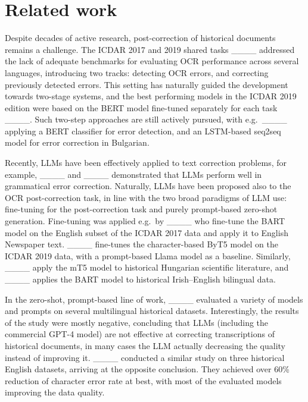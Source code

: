 \section{Related work}
Despite decades of active research, post-correction of historical documents remains a challenge. The ICDAR 2017 and 2019 shared tasks ____ addressed the lack of adequate benchmarks for evaluating OCR performance across several languages, introducing two tracks: detecting OCR errors, and correcting previously detected errors. This setting has naturally guided the development towards two-stage systems, and the best performing models in the ICDAR 2019 edition were based on the BERT model fine-tuned separately for each task ____. Such two-step approaches are still actively pursued, with e.g.\ ____ applying a BERT classifier for error detection, and an LSTM-based seq2seq model for error correction in Bulgarian.





Recently, LLMs have been effectively applied to text correction problems, for example, ____ and ____ demonstrated that LLMs perform well in grammatical error correction. Naturally, LLMs have been proposed also to the OCR post-correction task, in line with the two broad paradigms of LLM use: fine-tuning for the post-correction task and purely prompt-based zero-shot generation. Fine-tuning was applied e.g.\ by ____ who fine-tune the BART model on the English subset of the ICDAR 2017 data and apply it to English Newspaper text. ____ fine-tunes the character-based ByT5 model on the ICDAR 2019 data, with a prompt-based Llama model as a baseline. Similarly, ____ apply the mT5 model to historical Hungarian scientific literature, and ____ applies the BART model to historical Irish--English bilingual data. 


In the zero-shot, prompt-based line of work, ____ evaluated a variety of models and prompts on several multilingual historical datasets. Interestingly, the results of the study were mostly negative, concluding that LLMs (including the commercial GPT-4 model) are not effective at correcting transcriptions of historical documents, in many cases the LLM actually decreasing the quality instead of improving it. ____ conducted a similar study on three historical English datasets, arriving at the opposite conclusion. They achieved over 60\% reduction of character error rate at best, with most of the evaluated models improving the data quality.

